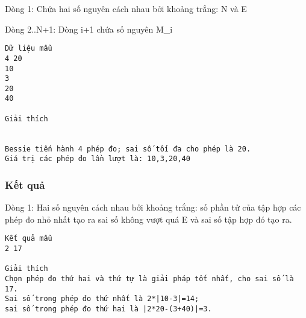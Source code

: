    Dòng 1: Chứa hai số nguyên cách nhau bởi khoảng trắng: N và E  

   Dòng 2..N+1: Dòng i+1 chứa số nguyên M\_i  
\begin{verbatim}
Dữ liệu mẫu
4 20
10
3
20
40

Giải thích


Bessie tiến hành 4 phép đo; sai số tối đa cho phép là 20. 
Giá trị các phép đo lần lượt là: 10,3,20,40
\end{verbatim}

\subsubsection{   Kết quả  }

   Dòng 1: Hai số nguyên cách nhau bởi khoảng trắng: số phần tử của tập hợp các phép đo nhỏ nhất tạo ra sai số không vượt quá E và sai số tập hợp đó tạo ra.  
\begin{verbatim}
Kết quả mẫu
2 17

Giải thích
Chọn phép đo thứ hai và thứ tự là giải pháp tốt nhất, cho sai số là 17. 
Sai số trong phép đo thứ nhất là 2*|10-3|=14; 
sai số trong phép đo thứ hai là |2*20-(3+40)|=3.
\end{verbatim}